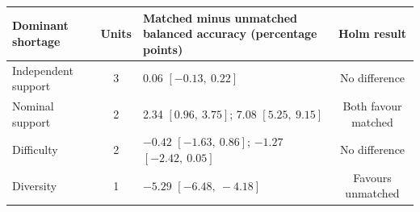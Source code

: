 \begin{tabularx}{\textwidth}{@{}l c X c@{}}
\toprule
Dominant shortage & Units & Matched minus unmatched balanced accuracy (percentage points) & Holm result \\
\midrule
Independent support & 3 & \num{0.06} $[-\num{0.13},\ \num{0.22}]$ & No difference \\
Nominal support & 2 & \num{2.34} $[\num{0.96},\ \num{3.75}]$; \num{7.08} $[\num{5.25},\ \num{9.15}]$ & Both favour matched \\
Difficulty & 2 & $-\num{0.42}$ $[-\num{1.63},\ \num{0.86}]$; $-\num{1.27}$ $[-\num{2.42},\ \num{0.05}]$ & No difference \\
Diversity & 1 & $-\num{5.29}$ $[-\num{6.48},\ -\num{4.18}]$ & Favours unmatched \\
\bottomrule
\end{tabularx}
